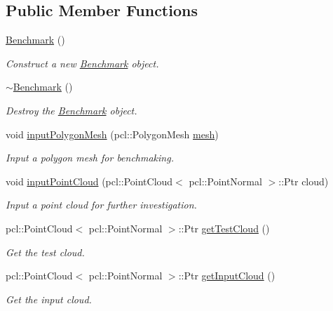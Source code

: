 \subsection*{Public Member Functions}
\begin{DoxyCompactItemize}
\item 
\hyperlink{classbenchmark_1_1_benchmark_aa4d9ebf50ca1abfa2ab9ba263c1c489b}{Benchmark} ()
\begin{DoxyCompactList}\small\item\em Construct a new \hyperlink{classbenchmark_1_1_benchmark}{Benchmark} object. \end{DoxyCompactList}\item 
\hyperlink{classbenchmark_1_1_benchmark_a7e4dce46b8658c405ab15bc81dc3b92c}{$\sim$\+Benchmark} ()
\begin{DoxyCompactList}\small\item\em Destroy the \hyperlink{classbenchmark_1_1_benchmark}{Benchmark} object. \end{DoxyCompactList}\item 
void \hyperlink{classbenchmark_1_1_benchmark_ae7df7c13433aa1e693b1860374e02c2e}{input\+Polygon\+Mesh} (pcl\+::\+Polygon\+Mesh \hyperlink{classbenchmark_1_1_benchmark_ac909ac5421efc317d13cccbe8049879d}{mesh})
\begin{DoxyCompactList}\small\item\em Input a polygon mesh for benchmaking. \end{DoxyCompactList}\item 
void \hyperlink{classbenchmark_1_1_benchmark_a9a2f37e57ce9f99a89f26b718468e9d0}{input\+Point\+Cloud} (pcl\+::\+Point\+Cloud$<$ pcl\+::\+Point\+Normal $>$\+::Ptr cloud)
\begin{DoxyCompactList}\small\item\em Input a point cloud for further investigation. \end{DoxyCompactList}\item 
pcl\+::\+Point\+Cloud$<$ pcl\+::\+Point\+Normal $>$\+::Ptr \hyperlink{classbenchmark_1_1_benchmark_a1b49288ec1193ac3bc85501091fb5b2f}{get\+Test\+Cloud} ()
\begin{DoxyCompactList}\small\item\em Get the test cloud. \end{DoxyCompactList}\item 
pcl\+::\+Point\+Cloud$<$ pcl\+::\+Point\+Normal $>$\+::Ptr \hyperlink{classbenchmark_1_1_benchmark_ab1dd595f97616c2879b7d102e32e9889}{get\+Input\+Cloud} ()
\begin{DoxyCompactList}\small\item\em Get the input cloud. \end{DoxyCompactList}\item 

\end{DoxyCompactItemize}
